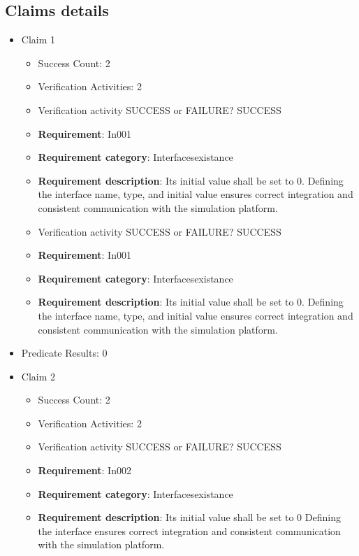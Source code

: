 \documentclass{article}
\begin{document}
			\subsection{Claims details}
			\begin{itemize}
  				  \item Claim 1
				\begin{itemize}
			    	\item Success Count: 2 
			    	\item Verification Activities: 2
					\item Verification activity SUCCESS or FAILURE? SUCCESS
		
						\item \textbf{Requirement}: In001 
						\item \textbf{Requirement category}: Interfacesexistance 
						\item \textbf{Requirement description}: Its initial value shall be set to 0. Defining the interface name, type, and initial value ensures correct integration and consistent communication with the simulation platform.
					
					\item Verification activity SUCCESS or FAILURE? SUCCESS
		
						\item \textbf{Requirement}: In001 
						\item \textbf{Requirement category}: Interfacesexistance 
						\item \textbf{Requirement description}: Its initial value shall be set to 0. Defining the interface name, type, and initial value ensures correct integration and consistent communication with the simulation platform.
					
				\end{itemize}
				
									    
				\item Predicate Results: 0

  				  \item Claim 2
				\begin{itemize}
			    	\item Success Count: 2 
			    	\item Verification Activities: 2
					\item Verification activity SUCCESS or FAILURE? SUCCESS
		
						\item \textbf{Requirement}: In002 
						\item \textbf{Requirement category}: Interfacesexistance 
						\item \textbf{Requirement description}: Its initial value shall be set to 0 Defining the interface ensures correct integration and consistent communication with the simulation platform.
					

\end{itemize}
\end{itemize}
\end{document}
